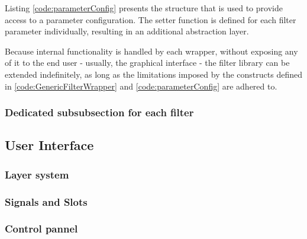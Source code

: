 Listing \ref{code:parameterConfig} presents the structure that is used to provide access to a parameter
configuration. The setter function is defined for each filter parameter individually, resulting in an
additional abstraction layer.

Because internal functionality is handled by each wrapper, without exposing any of it to the end
user - usually, the graphical interface - the filter library can be extended indefinitely, as long as
the limitations imposed by the constructs defined in \ref{code:GenericFilterWrapper} and 
\ref{code:parameterConfig} are adhered to.

\subsubsection{Dedicated subsubsection for each filter}


\subsection{User Interface}

\subsubsection{Layer system}

\subsubsection{Signals and Slots}

\subsubsection{Control pannel}












